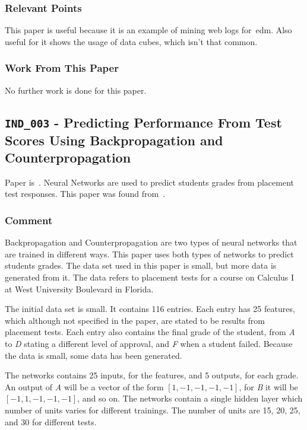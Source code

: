 \subsubsection{Relevant Points}

This paper is useful because it is an example of mining web logs for~\gls{edm}.
Also useful for it shows the usage of data cubes, which isn't that common.

\subsubsection{Work From This Paper}

No further work is done for this paper.

\subsection{\texttt{IND\_003} - Predicting Performance From Test Scores Using
Backpropagation and Counterpropagation}

Paper is~\cite{ind_003}. Neural Networks are used to predict students grades
from placement test responses. This paper was found from~\cite{ind_001}.

\subsubsection{Comment}

Backpropagation and Counterpropagation are two types of neural networks that
are trained in different ways. This paper uses both types of networks to
predict students grades. The data set used in this paper is small, but more
data is generated from it. The data refers to placement tests for a course on
Calculus I at West University Boulevard in Florida.

The initial data set is small. It contains 116 entries. Each entry has 25
features, which although not specified in the paper, are stated to be results
from placement tests. Each entry also contains the final grade of the student,
from \textit{A} to \textit{D} stating a different level of approval, and
\textit{F} when a student failed. Because the data is small, some data has been
generated.

The networks contains 25 inputs, for the features, and 5 outputs, for each
grade. An output of \textit{A} will be a vector of the form $ [1, -1, -1, -1,
-1] $, for \textit{B} it will be $ [-1, 1, -1, -1, -1] $, and so on. The
networks contain a single hidden layer which number of units varies for
different trainings. The number of units are 15, 20, 25, and 30 for different
tests.

